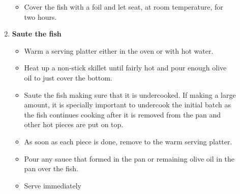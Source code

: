 \documentclass[11pt,letterpaper]{article}
\newcommand \fileName {FishWithEssaouiraChermoula}
\begin{document}
\begin{description}
\begin{enumerate}
\begin{itemize}
		\item Cover the fish with a foil and let seat, at room temperature, for two hours.
		\end{itemize}
	\item {\bf Saute the fish}
		\begin{itemize}
		\item Warm a serving platter either in the oven or with hot water.
		\item Heat up a non-stick skillet until fairly hot and pour enough olive oil to just cover the bottom. 
		\item Saute the fish making sure that it is undercooked. If making a large amount, it is specially important to undercook the initial batch as the fish continues cooking after it is removed from the pan and other hot pieces are put on top.
		\item As soon as each piece is done, remove to the warm serving platter.
		\item Pour any sauce that formed in the pan or remaining olive oil in the pan over the fish.
		\item Serve immediately
		\end{itemize}
	\end{enumerate}
\end{description}

\end{document}
